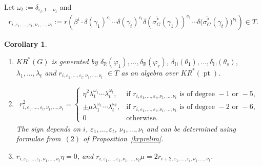\documentclass[pdftex]{sigma}
\numberwithin{equation}{section}
\newtheorem{Corollary}[Theorem]{Corollary}
\DeclareMathOperator{\pt}{pt}
\begin{document}
\begin{Definition}
Let $\omega_t:=\delta_{\epsilon_t, 1-\nu_t}$ and
\begin{gather*}
r_{i, \varepsilon_1, \dots, \varepsilon_t, \nu_1, \dots,
\nu_t}:=r\left(\beta^i\cdot\delta(\gamma_1)^{\varepsilon_1}\cdots\delta(\gamma_t)^{\varepsilon_t}\delta(\overline{\sigma_G^*}
(\gamma_1))^{\nu_1}\cdots\delta\big(\overline{\sigma_G^*}(\gamma_t)\big)^{\nu_t}\right)\in T.
\end{gather*}
\end{Definition}
\begin{Corollary}\label{krglooseend}\quad
\begin{enumerate}\itemsep=0pt
\item[$1.$]
$KR^*(G)$ is generated by $\delta_\mathbb{R}(\varphi_1),  {\dots}, \delta_\mathbb{R}(\varphi_r)$,
$\delta_\mathbb{H}(\theta_1),  {\dots}, \delta_\mathbb{H}(\theta_s)$, $\lambda_1,  {\dots}, \lambda_t\!$ and $r_{i,
\varepsilon_1, {\dots}, \varepsilon_t, \nu_1, {\dots}, \nu_t}$ $\in T$ as an algebra over $KR^*(\pt)$.
\item[$2.$]
\begin{gather*}
r_{i, \varepsilon_1, \dots, \varepsilon_t, \nu_1, \dots, \nu_t}^2=
\begin{cases}
\eta^2\lambda_1^{\omega_1}\cdots\lambda_t^{\omega_t},
&\text{if }r_{i, \varepsilon_1, \dots, \varepsilon_t, \nu_1, \dots, \nu_t}\text{ is of degree }-1\text{ or }-5,
\\
\pm\mu\lambda_1^{\omega_1}\cdots\lambda_t^{\omega_t},
&\text{if }r_{i, \varepsilon_1, \dots, \varepsilon_t, \nu_1, \dots, \nu_t}\text{ is of degree }-2\text{ or }-6,
\\
0
&\text{otherwise}.
\end{cases}
\end{gather*}
The sign depends on $i$, $\varepsilon_1, \dots, \varepsilon_t$, $\nu_1, \dots, \nu_t$ and can be determined using formulae
from~$(2)$ of Proposition~{\rm \ref{krprelim}}.
\item[$3.$]
$r_{i, \varepsilon_1, \dots, \varepsilon_t, \nu_1, \dots, \nu_t}\eta=0$, and $r_{i, \varepsilon_1, \dots, \varepsilon_t,
\nu_1, \dots, \nu_t}\mu=2r_{i+2, \varepsilon_1, \dots, \varepsilon_t, \nu_1, \dots, \nu_t}$.
\end{enumerate}
\end{Corollary}
\end{document}

